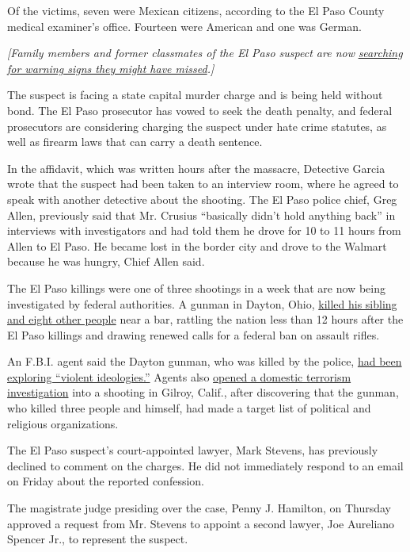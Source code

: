 Of the victims, seven were Mexican citizens, according to the El Paso
County medical examiner's office. Fourteen were American and one was
German.

\emph{{[}Family members and former classmates of the El Paso suspect are
now}
\href{https://www.nytimes.com/2019/08/08/us/el-paso-suspect.html}{\emph{searching
for warning signs they might have missed}}\emph{.{]}}

The suspect is facing a state capital murder charge and is being held
without bond. The El Paso prosecutor has vowed to seek the death
penalty, and federal prosecutors are considering charging the suspect
under hate crime statutes, as well as firearm laws that can carry a
death sentence.

In the affidavit, which was written hours after the massacre, Detective
Garcia wrote that the suspect had been taken to an interview room, where
he agreed to speak with another detective about the shooting. The El
Paso police chief, Greg Allen, previously said that Mr. Crusius
``basically didn't hold anything back'' in interviews with investigators
and had told them he drove for 10 to 11 hours from Allen to El Paso. He
became lost in the border city and drove to the Walmart because he was
hungry, Chief Allen said.

The El Paso killings were one of three shootings in a week that are now
being investigated by federal authorities. A gunman in Dayton, Ohio,
\href{https://www.nytimes.com/2019/08/09/us/dayton-shooting-nan-whaley.html}{killed
his sibling and eight other people} near a bar, rattling the nation less
than 12 hours after the El Paso killings and drawing renewed calls for a
federal ban on assault rifles.

An F.B.I. agent said the Dayton gunman, who was killed by the police,
\href{https://www.nytimes.com/2019/08/06/us/mass-shootings.html}{had
been exploring ``violent ideologies.''} Agents also
\href{https://www.nytimes.com/2019/08/06/us/gilroy-calif-shooting-domestic-terrorism.html}{opened
a domestic terrorism investigation} into a shooting in Gilroy, Calif.,
after discovering that the gunman, who killed three people and himself,
had made a target list of political and religious organizations.

The El Paso suspect's court-appointed lawyer, Mark Stevens, has
previously declined to comment on the charges. He did not immediately
respond to an email on Friday about the reported confession.

The magistrate judge presiding over the case, Penny J. Hamilton, on
Thursday approved a request from Mr. Stevens to appoint a second lawyer,
Joe Aureliano Spencer Jr., to represent the suspect.

